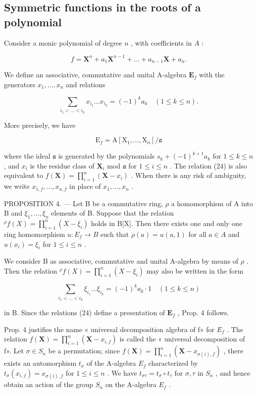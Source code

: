 \subsection{Symmetric functions in the roots of a polynomial}

Consider a monic polynomial of degree \(n\) , with coefficients in \(A\) :

\[
f = \mathbf {X} ^ {n} + a _ {1} \mathbf {X} ^ {n - 1} + \dots + a _ {n - 1} \mathbf {X} + a _ {n}.
\]

We define an associative, commutative and unital A-algebra \(\mathbf{E}_f\) with the generators \(x_{1},\ldots ,x_{n}\) and relations

\[
\sum_ {i _ {1} <   \dots <   i _ {k}} x _ {i _ {1}} \dots x _ {i _ {k}} = (- 1) ^ {k} a _ {k} \quad (1 \leqslant k \leqslant n).\tag{24}
\]

More precisely, we have

\[
\mathrm{E} _ {f} = \mathrm{A} [ \mathrm{X} _ {1}, \dots , \mathrm{X} _ {n} ] / \mathfrak {a}
\]

where the ideal \(\mathfrak{a}\) is generated by the polynomials \(s_k + (-1)^{k+1} a_k\) for \(1 \leqslant k \leqslant n\) , and \(x_i\) is the residue class of \(\mathbf{X}_i\) mod \(\mathfrak{a}\) for \(1 \leqslant i \leqslant n\) . The relation (24) is also equivalent to \(f(\mathbf{X}) = \prod_{i=1}^{n} (\mathbf{X} - x_i)\) . When there is any risk of ambiguity, we write \(x_{1,f}, \ldots, x_{n,f}\) in place of \(x_1, \ldots, x_n\) .

PROPOSITION 4. --- Let B be a commutative ring, \(\rho\) a homomorphism of A into B and \(\xi_1, \ldots, \xi_n\) elements of B. Suppose that the relation \( {}^{\rho}f(X) = \prod_{i=1}^{n}(X - \xi_i)\) holds in B{[}X{]}. Then there exists one and only one ring homomorphism \(u: E_f \to B\) such that \(\rho(a) = u(a, 1)\) for all \(a \in A\) and \(u(x_i) = \xi_i\) for \(1 \leqslant i \leqslant n\) .

We consider B as associative, commutative and unital A-algebra by means of \(\rho\) . Then the relation \({}^{\rho}f(X) = \prod_{i=1}^{n}(X - \xi_i)\) may also be written in the form

\[
\sum_ {i _ {1} <   \dots <   i _ {k}} \xi_ {i _ {1}} \dots \xi_ {i _ {k}} = (- 1) ^ {k} a _ {k} \cdot 1 \quad (1 \leqslant k \leqslant n)
\]

in B. Since the relations (24) define a presentation of \(\mathbf{E}_f\) , Prop. 4 follows.

Prop. 4 justifies the name « universal decomposition algebra of f» for \(E_{f}\) . The relation \(f(\mathbf{X}) = \prod_{i=1}^{n} (\mathbf{X} - x_{i,f})\) is called the « universal decomposition of f». Let \(\sigma \in S_{n}\) be a permutation; since \(f(\mathbf{X}) = \prod_{i=1}^{n} (\mathbf{X} - x_{\sigma(i),f})\) , there exists an automorphism \(t_{\sigma}\) of the A-algebra \(E_{f}\) characterized by \(t_{\sigma}(x_{i,f}) = x_{\sigma(i),f}\) for \(1 \leqslant i \leqslant n\) . We have \(t_{\sigma\tau} = t_{\sigma} \circ t_{\tau}\) for \(\sigma, \tau\) in \(S_{n}\) , and hence obtain an action of the group \(S_{n}\) on the A-algebra \(E_{f}\) .

